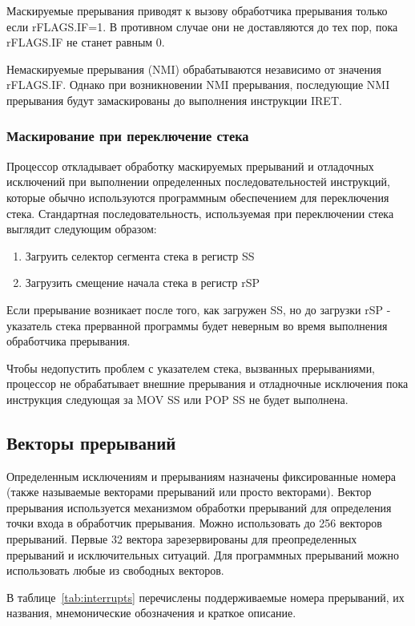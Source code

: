 Маскируемые прерывания приводят к вызову обработчика прерывания только если
rFLAGS.IF=1. В противном случае они не доставляются до тех пор, пока rFLAGS.IF
не станет равным 0.

Немаскируемые прерывания (NMI) обрабатываются независимо от значения rFLAGS.IF.
Однако при возникновении NMI прерывания, последующие NMI прерывания будут
замаскированы до выполнения инструкции IRET.

\subsubsection*{Маскирование при переключение стека}
Процессор откладывает обработку маскируемых прерываний и отладочных исключений
при выполнении определенных последовательностей инструкций, которые обычно
используются программным обеспечением для переключения стека. Стандартная
последовательность, используемая при переключении стека выглядит следующим
образом:
\begin{enumerate}[1.]
\item Загруить селектор сегмента стека в регистр SS
\item Загрузить смещение начала стека в регистр rSP
\end{enumerate}

Если прерывание возникает после того, как загружен SS, но до загрузки rSP -
указатель стека прерванной программы будет неверным во время выполнения
обработчика прерывания.

Чтобы недопустить проблем с указателем стека, вызванных прерываниями,
процессор не обрабатывает внешние прерывания и отладночные исключения пока
инструкция следующая за MOV SS или POP SS не будет выполнена.

\subsection{Векторы прерываний}
Определенным исключениям и прерываниям назначены фиксированные номера (также
называемые векторами прерываний или просто векторами). Вектор прерывания
используется механизмом обработки прерываний для определения точки входа в
обработчик прерывания. Можно использовать до 256 векторов прерываний. Первые 32 вектора
зарезервированы для преопределенных прерываний и исключительных ситуаций.
Для программных прерываний можно использовать любые из свободных векторов.

В таблице~\ref{tab:interrupts} перечислены поддерживаемые номера прерываний, их названия,
мнемонические обозначения и краткое описание.

